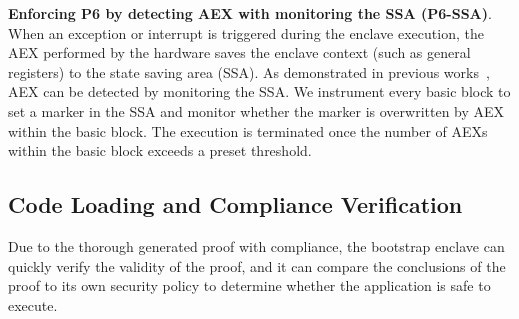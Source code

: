 {\vspace{3pt}\noindent\textbf{Enforcing P6 by detecting AEX with monitoring the SSA (P6-SSA)}. When an exception or interrupt is triggered during the enclave execution, the AEX performed by the hardware saves the enclave context (such as general registers) to the state saving area (SSA).
As demonstrated in previous works~\cite{gruss2017strong,chen2018racing}, AEX can be detected by monitoring the SSA. We instrument every basic block to set a marker in the SSA and monitor whether the marker is overwritten by AEX within the basic block. The execution is terminated once the number of AEXs within the basic block exceeds a preset threshold.



\subsection{Code Loading and Compliance Verification}
\label{subsec:verify}

Due to the thorough generated proof with compliance, the bootstrap enclave can quickly verify the validity of the proof, and it can compare the conclusions of the proof to its own security policy to determine whether the application is safe to execute.

}
